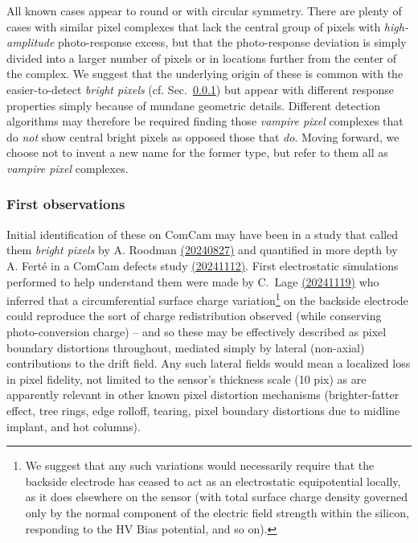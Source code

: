 All known cases appear to round or with circular symmetry. There are plenty of cases with similar pixel complexes that lack the central group of pixels with {\it high-amplitude} photo-response excess, but that the photo-response deviation is simply divided into a larger number of pixels or in locations further from the center of the complex. We suggest that the underlying origin of these is common with the easier-to-detect {\it bright pixels} (cf. Sec.~\ref{first-observations}) but appear with different response properties simply because of mundane geometric details. Different detection algorithms may therefore be required finding those {\it vampire pixel} complexes that do {\it not} show central bright pixels as opposed those that {\it do}. Moving forward, we choose not to invent a new name for the former type, but refer to them all as {\it vampire pixel} complexes.

\subsubsection{First observations}\label{first-observations}

Initial identification of these on ComCam may have been in a study that called them {\it bright pixels} by A. Roodman \href{https://confluence.slac.stanford.edu/download/attachments/209355949/Bad%20Pixels%20and%20Bright%20Spots.pdf?version=1&modificationDate=1724769154615&api=v2}{(20240827)} and quantified in more depth by A. Fert\'e in a ComCam defects study \href{https://rubin-obs.slack.com/files/U07MZAE6V3P/F080JU4CH8A/isr_science_unit_meeting__11_12_2024_-_vampire_pixels.pdf}{(20241112)}. First electrostatic simulations performed to help understand them were made by C.~Lage \href{https://confluence.slac.stanford.edu/download/attachments/209355949/Vampire_Pixel_Simulations_18Nov24.pdf?version=1&modificationDate=1731964502136&api=v2}{(20241119)} who inferred that a circumferential surface charge variation\footnote{We suggest that any such variations would necessarily require that the backside electrode has ceased to act as an electrostatic equipotential locally, as it does elsewhere on the sensor (with total surface charge density governed only by the normal component of the electric field strength within the silicon, responding to the HV Bias potential, and so on).} 
on the backside electrode could reproduce the sort of charge redistribution observed (while conserving photo-conversion charge) -- and so these may be effectively described as pixel boundary distortions throughout, mediated simply by lateral (non-axial) contributions to the drift field. Any such lateral fields would mean a localized loss in pixel fidelity, not limited to the sensor's thickness scale (10 pix) as are apparently relevant in other known pixel distortion mechanisms (brighter-fatter effect, tree rings, edge rolloff, tearing, pixel boundary distortions due to midline implant, and hot columns).

